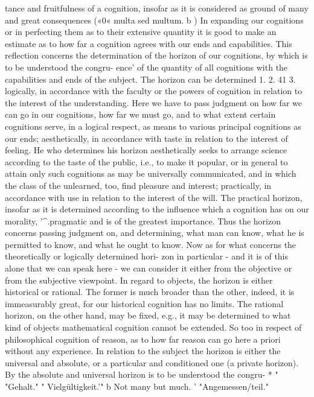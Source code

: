 tance and fruitfulness of a cognition, insofar as it is considered as ground
of many and great consequences («0« multa sed multum. b )
In expanding our cognitions or in perfecting them as to their extensive
quantity it is good to make an estimate as to how far a cognition agrees
with our ends and capabilities. This reflection concerns the determination
of the horizon of our cognitions, by which is to be understood the congru-
ence' of the quantity of all cognitions with the capabilities and ends of the subject.
The horizon can be determined
1.
2.
41
3.
logically, in accordance with the faculty or the powers of cognition in relation
to the interest of the understanding. Here we have to pass judgment on how far
we can go in our cognitions, how far we must go, and to what extent certain
cognitions serve, in a logical respect, as means to various principal cognitions
as our ends;
aesthetically, in accordance with taste in relation to the interest of feeling. He
who determines his horizon aesthetically seeks to arrange science according
to the taste of the public, i.e., to make it popular, or in general to attain only
such cognitions as may be universally communicated, and in which the class
of the unlearned, too, find pleasure and interest;
practically, in accordance with use in relation to the interest of the will. The
practical horizon, insofar as it is determined according to the influence which
a cognition has on our morality, '^.pragmatic and is of the greatest importance.
Thus the horizon concerns passing judgment on, and determining, what
man can know, what he is permitted to know, and what he ought to know.
Now as for what concerns the theoretically or logically determined hori-
zon in particular - and it is of this alone that we can speak here - we can
consider it either from the objective or from the subjective viewpoint.
In regard to objects, the horizon is either historical or rational. The
former is much broader than the other, indeed, it is immeasurably great,
for our historical cognition has no limits. The rational horizon, on the
other hand, may be fixed, e.g., it may be determined to what kind of
objects mathematical cognition cannot be extended. So too in respect of
philosophical cognition of reason, as to how far reason can go here a priori
without any experience.
In relation to the subject the horizon is either the universal and absolute,
or a particular and conditioned one (a private horizon).
By the absolute and universal horizon is to be understood the congru-
*
" "Gehalt."
" Vielgültigkeit.'"
b Not many but much.
'
"Angemessen/teil."
